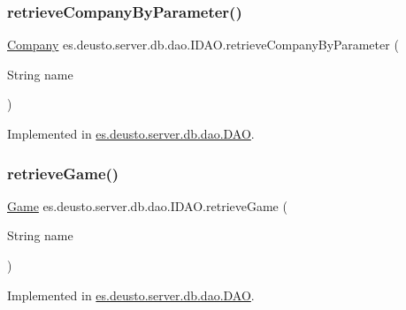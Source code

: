 \subsubsection{\texorpdfstring{retrieve\+Company\+By\+Parameter()}{retrieveCompanyByParameter()}}
{\footnotesize\ttfamily \hyperlink{classes_1_1deusto_1_1server_1_1db_1_1data_1_1_company}{Company} es.\+deusto.\+server.\+db.\+dao.\+I\+D\+A\+O.\+retrieve\+Company\+By\+Parameter (\begin{DoxyParamCaption}\item[{String}]{name }\end{DoxyParamCaption})}



Implemented in \hyperlink{classes_1_1deusto_1_1server_1_1db_1_1dao_1_1_d_a_o_af3dc3f84b3ea6981bd5e93d54ab45169}{es.\+deusto.\+server.\+db.\+dao.\+D\+AO}.

\mbox{\label{interfacees_1_1deusto_1_1server_1_1db_1_1dao_1_1_i_d_a_o_a30558c19c086ac0ffff6796a8ae208fb}} 
\subsubsection{\texorpdfstring{retrieve\+Game()}{retrieveGame()}}
{\footnotesize\ttfamily \hyperlink{classes_1_1deusto_1_1server_1_1db_1_1data_1_1_game}{Game} es.\+deusto.\+server.\+db.\+dao.\+I\+D\+A\+O.\+retrieve\+Game (\begin{DoxyParamCaption}\item[{String}]{name }\end{DoxyParamCaption})}



Implemented in \hyperlink{classes_1_1deusto_1_1server_1_1db_1_1dao_1_1_d_a_o_ac94a91d3e5aeeb98fc12f087532b3506}{es.\+deusto.\+server.\+db.\+dao.\+D\+AO}.

\mbox{\label{interfacees_1_1deusto_1_1server_1_1db_1_1dao_1_1_i_d_a_o_a5189543a4a8e9e3bed8df7d452db283a}} 

